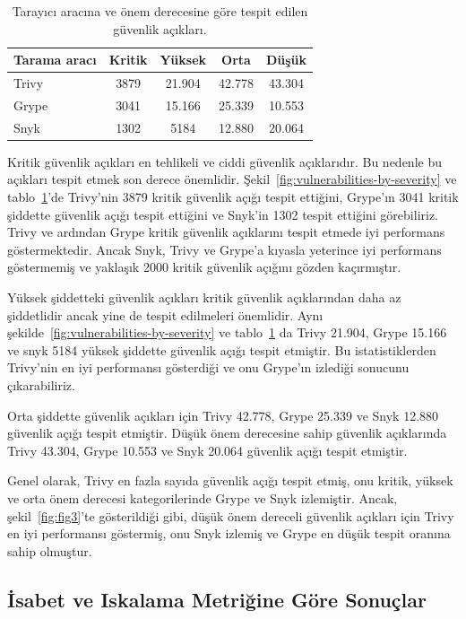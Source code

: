 \begin{table}
    \caption{Tarayıcı aracına ve önem derecesine göre tespit edilen güvenlik açıkları.}\label{tab:scanner-vuln-severity}
    \centering
    \begin{tabular}{ |l|c|c|c|c| }
        \hline
        Tarama aracı & Kritik & Yüksek & Orta & Düşük \\
        \hline
        Trivy & 3879 & 21.904 & 42.778 & 43.304 \\
        Grype & 3041 & 15.166 & 25.339 & 10.553 \\
        Snyk  & 1302 & 5184  & 12.880 & 20.064 \\
        \hline
    \end{tabular}
\end{table}

Kritik güvenlik açıkları en tehlikeli ve ciddi güvenlik açıklarıdır. Bu nedenle bu açıkları tespit etmek son derece önemlidir. Şekil~\ref{fig:vulnerabilities-by-severity} ve tablo~\ref{tab:scanner-vuln-severity}'de Trivy'nin 3879 kritik güvenlik açığı tespit ettiğini, Grype'ın 3041 kritik şiddette güvenlik açığı tespit ettiğini ve Snyk'in 1302 tespit ettiğini görebiliriz. Trivy ve ardından Grype kritik güvenlik açıklarını tespit etmede iyi performans göstermektedir. Ancak Snyk, Trivy ve Grype'a kıyasla yeterince iyi performans göstermemiş ve yaklaşık 2000 kritik güvenlik açığını gözden kaçırmıştır.

Yüksek şiddetteki güvenlik açıkları kritik güvenlik açıklarından daha az şiddetlidir ancak yine de tespit edilmeleri önemlidir. Aynı şekilde~\ref{fig:vulnerabilities-by-severity} ve tablo~\ref{tab:scanner-vuln-severity} da Trivy 21.904, Grype 15.166 ve snyk 5184 yüksek şiddette güvenlik açığı tespit etmiştir. Bu istatistiklerden Trivy'nin en iyi performansı gösterdiği ve onu Grype'ın izlediği sonucunu çıkarabiliriz.

Orta şiddette güvenlik açıkları için Trivy 42.778, Grype 25.339 ve Snyk 12.880 güvenlik açığı tespit etmiştir. Düşük önem derecesine sahip güvenlik açıklarında Trivy 43.304, Grype 10.553 ve Snyk 20.064 güvenlik açığı tespit etmiştir.

Genel olarak, Trivy en fazla sayıda güvenlik açığı tespit etmiş, onu kritik, yüksek ve orta önem derecesi kategorilerinde Grype ve Snyk izlemiştir. Ancak, şekil~\ref{fig:fig3}'te gösterildiği gibi, düşük önem dereceli güvenlik açıkları için Trivy en iyi performansı göstermiş, onu Snyk izlemiş ve Grype en düşük tespit oranına sahip olmuştur.

\subsection{İsabet ve Iskalama Metriğine Göre Sonuçlar}\label{subsec:ResultsbyHitandMissMetric}

